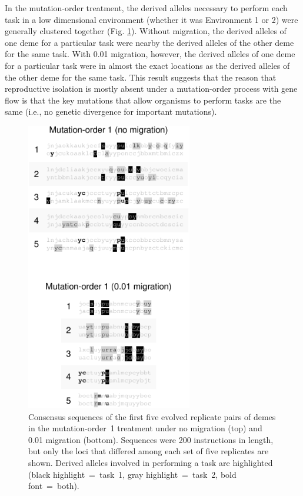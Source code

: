 \begin{doublespace}
In the mutation-order treatment,
the derived alleles necessary to perform
each task in a low dimensional environment
(whether it was Environment 1 or 2)
were generally clustered together
(Fig. \ref{task_muts}).
%
Without migration,
the derived alleles of one deme for a particular task
were nearby the derived alleles of the other deme for the same task.
%
With 0.01 migration, however,
the derived alleles of one deme for a particular task
were in almost the exact locations
as the derived alleles of the other deme for the same task.
%
This result suggests that the reason that reproductive isolation
is mostly absent under a mutation-order process with gene flow
is that the key mutations that allow organisms to perform tasks are the same
(i.e., no genetic divergence for important mutations).

\begin{figure}
\centering
\includegraphics[height=5in]{task-muts.pdf}
\caption{Consensus sequences of the first five evolved replicate pairs of demes
  in the mutation-order~1 treatment under no migration (top)
  and 0.01 migration (bottom).
  Sequences were 200 instructions in length,
  but only the loci that differed among
  each set of five replicates are shown.
  Derived alleles involved in performing a task are highlighted
  (black highlight~=~task~1, gray highlight~=~task~2, bold font~=~both).}
\label{task_muts}
\end{figure}


\end{doublespace}
